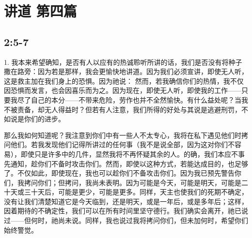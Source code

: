 

\section{讲道 第四篇}


\subsection{ 2:5-7}

\par

1. 我本来希望确知，是否有人以应有的热诚聆听所讲的话，我们是否没有将种子撒在路旁：因为若是那样，我会更愉快地讲道。因为我们必须宣讲，即使无人听，这是救主加在我们身上的恐惧。因为祂说：  然而，若我确信你们的热情，我不仅因恐惧而发言，也会因喜乐而为之。因为现在，即使无人听，即使我的工作——只要我尽了自己的本分——不带来危险，劳作也并不全然愉快。有什么益处呢？当我不被责备，却无人得益时？但若有人注意，我们所得的好处与其说是逃避刑罚，不如说是你们的进步。\par

那么我如何知道呢？我注意到你们中有一些人不太专心，我将在私下遇见他们时拷问他们。若我发现他们记得所讲过的任何事（我不是说全部，因为这对你们不容易），即使只是许多中的几件，显然我将不再怀疑其余的人。的确，我们本应不事先通知，趁你们不备时攻击你们。然而，即使以这种方式，若能达成目的，也足够了。不仅如此，即使现在，我也可以趁你们不备攻击你们。因为我已预先警告你们，我拷问你们；但拷问，我尚未表明。因为可能是今天，可能是明天，可能是二十天或三十天后，可能是更少，可能是更多。同样，天主也使我们的死期不确定，没有让我们清楚知道它是今天临到，还是明天，或是一年后，或是多年后；这样，因着期待的不确定性，我们可以在所有时间里坚守德行。我们确实会离开，祂已说过——但何时，祂尚未说。同样，我也说过我将拷问你们，但未加何时，希望你们始终警觉。\par

